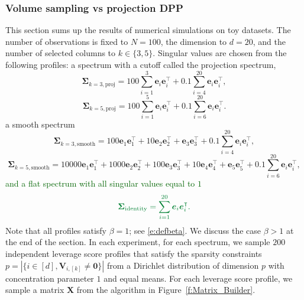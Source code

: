 \documentclass[twoside,11pt]{book}
\newcommand{\rev}[1]{\textcolor{darkgreen}{#1}}
\numberwithin{theorem}{chapter}
\numberwithin{definition}{chapter}
\numberwithin{proposition}{chapter}
\numberwithin{corollary}{chapter}
\numberwithin{example}{chapter}
\numberwithin{lemma}{chapter}
\numberwithin{assumption}{chapter}
\DeclareMathOperator{\Tran}{\intercal}
\begin{document}
\subsubsection{Volume sampling vs projection DPP}
This section sums up the results of numerical simulations on toy datasets. The number of observations is fixed to $N =100 $, the dimension to $d = 20$, and the number of selected columns to $k \in \{3,5\}$. Singular values are chosen from the following profiles: a spectrum with a cutoff called the projection spectrum,
$$
	\bm{\Sigma}_{k=3,\text{proj}} = 100 \sum\limits_{i = 1}^{3} \bm{e}_{i}\bm{e}_{i}^{\Tran} + 0.1 \sum\limits_{i = 4}^{20} \bm{e}_{i}\bm{e}_{i}^{\Tran}, $$
$$
	\bm{\Sigma}_{k=5,\text{proj}} = 100 \sum\limits_{i = 1}^{5} \bm{e}_{i}\bm{e}_{i}^{\Tran} + 0.1 \sum\limits_{i = 6}^{20} \bm{e}_{i}\bm{e}_{i}^{\Tran}. $$
a smooth spectrum
$$
	\bm{\Sigma}_{k=3,\text{smooth}} = 100\bm{e}_{1}\bm{e}_{1}^{\Tran} + 10\bm{e}_{2}\bm{e}_{2}^{\Tran} + \bm{e}_{3}\bm{e}_{3}^{\Tran} + 0.1 \sum\limits_{i = 4}^{20} \bm{e}_{i}\bm{e}_{i}^{\Tran},$$
$$
	\bm{\Sigma}_{k=5,\text{smooth}} = 10000\bm{e}_{1}\bm{e}_{1}^{\Tran} + 1000\bm{e}_{2}\bm{e}_{2}^{\Tran} + 100\bm{e}_{3}\bm{e}_{3}^{\Tran} +  10\bm{e}_{4}\bm{e}_{4}^{\Tran} +  \bm{e}_{5}\bm{e}_{5}^{\Tran} + 0.1 \sum\limits_{i = 6}^{20} \bm{e}_{i}\bm{e}_{i}^{\Tran},
	$$
\rev{and a flat spectrum with all singular values equal to $1$}
$$
\rev{    \bm{\Sigma}_{\text{identity}} = \sum\limits_{i = 1}^{20} \bm{e}_{i}\bm{e}_{i}^{\Tran}.}
    $$
Note that all profiles satisfy $\beta=1$; see \eqref{e:defbeta}. We discuss the case $\beta > 1$ at the end of the section. In each experiment, for each spectrum, we sample $200$ independent leverage score profiles that satisfy the sparsity constraints $p = \left| \{i \in [d], \bm{V}_{i,[k]} \neq \bm{0}\}\right|$ from a Dirichlet distribution of dimension $p$ with concentration parameter $1$ and equal means. For each leverage score profile, we sample a matrix $\bm{X}$ from the algorithm in Figure~\ref{f:Matrix_Builder}.
\end{document}
